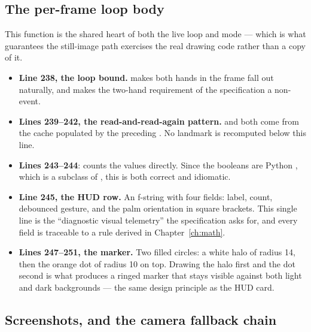 \subsection{The per-frame loop body}

\begin{codecard}

\end{codecard}

This function is the shared heart of both the live loop and  mode --- which is what
guarantees the still-image path exercises the real drawing code rather than a copy of it.

\begin{itemize}
  \item \textbf{Line 238, the loop bound.}  makes both hands in
        the frame fall out naturally, and makes the two-hand requirement of the specification a
        non-event.
  \item \textbf{Lines 239--242, the read-and-read-again pattern.}  and
         both come from the cache populated by the preceding
        . No landmark is recomputed below this line.
  \item \textbf{Lines 243--244}:  counts the  values directly. Since the
        booleans are Python , which is a subclass of , this is both correct and
        idiomatic.
  \item \textbf{Line 245, the HUD row.} An f-string with four fields: label, count, debounced
        gesture, and the palm orientation in square brackets. This single line is the ``diagnostic
        visual telemetry'' the specification asks for, and every field is traceable to a rule
        derived in Chapter~\ref{ch:math}.
  \item \textbf{Lines 247--251, the marker.} Two filled circles: a white halo of radius 14, then the
        orange dot of radius 10 on top. Drawing the halo first and the dot second is what produces a
        ringed marker that stays visible against both light and dark backgrounds --- the same design
        principle as the HUD card.
\end{itemize}

\subsection{Screenshots, and the camera fallback chain}

